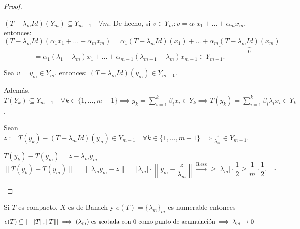 \begin{teo}
\begin{proof}
\begin{description}
        \noindent $(T - \lambda_m Id)(Y_m) \subseteq Y_{m-1} \quad \forall m$. De hecho, si $v \in Y_m : v = \alpha_1 x_1 + \dots + \alpha_m x_m$, entonces:
        \[ (T - \lambda_m Id)(\alpha_1 x_1 + \dots + \alpha_m x_m) = \alpha_1 (T - \lambda_m Id)(x_1) + \dots + \alpha_m \underbrace{(T - \lambda_m Id)(x_m)}_{0} = \]
        \[ = \alpha_1 (\lambda_1 - \lambda_m) x_1 + \dots + \alpha_{m-1} (\lambda_{m-1} - \lambda_m) x_{m-1} \in Y_{m-1}. \]

        \noindent Sea $v = y_m \in Y_m$, entonces: $(T - \lambda_m Id)(y_m) \in Y_{m-1}$.

        \noindent Además, $T(Y_k) \subseteq Y_{m-1} \quad \forall k \in \{1, \dots, m-1\} \implies y_k = \sum_{i=1}^{k} \beta_i x_i \in Y_k \implies T(y_k) = \sum_{i=1}^{k} \beta_i \lambda_i x_i \in Y_k$.

        \noindent Sean $z := T(y_k) - (T - \lambda_m Id)(y_m) \in Y_{m-1} \quad \forall k \in \{1, \dots, m-1\} \implies \frac{z}{\lambda_m} \in Y_{m-1}$.

        \noindent $T(y_k) - T(y_m) = z - \lambda_m y_m$
        \[ \|T(y_k) - T(y_m)\| = \|\lambda_m y_m - z\| = |\lambda_m| \cdot \left\| y_m - \frac{z}{\lambda_m} \right\| \xrightarrow{\text{Riesz}} \geq |\lambda_m| \cdot \frac{1}{2} \geq \frac{1}{\bar{m}} \cdot \frac{1}{2}. \quad \square \]
    \end{description}
\end{proof}
\end{teo}


\begin{observacion}
    Si $T$ es compacto, $X$ es de Banach y  $e(T) = \{\lambda_m\}_m$ es numerable entonces 
    \begin{equation*}
            e(T) \subseteq [-\|T\|, \|T\|] \implies (\lambda_m) \text{ es acotada con } 0 \text{ como punto de acumulación} \implies \lambda_m \to 0 \\
    \end{equation*}
\end{observacion}


